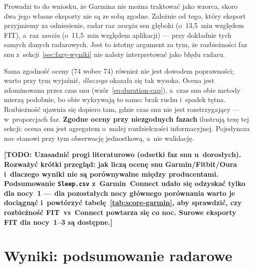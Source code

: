 \documentclass[12pt,a4paper,oneside]{report}
\newcommand{\todo}[1]{\textcolor{red!75!black}{\textbf{[TODO: #1]}}}
\begin{document}
Prowadzi to do wniosku, że Garmina nie można traktować jako wzorca, skoro
dwa jego własne eksporty nie są ze sobą zgodne. Zależnie od tego, który eksport
przyjmiemy za odniesienie, radar raz \emph{zawyża} sen głęboki (o~13,5~min względem FIT),
a~raz \emph{zaniża} (o~11,5~min względem aplikacji) --- przy dokładnie tych
samych danych radarowych. Jest to istotny argument za
tym, że rozbieżności faz snu z~sekcji~\ref{sec:fazy-wyniki} nie należy
interpretować jako błędu radaru.

Sama zgodność oceny (74 wobec 74) również nie jest dowodem poprawności; warto
przy tym wyjaśnić, \emph{dlaczego} okazała się tak wysoka. Ocena jest zdominowana przez czas
snu (wzór~\eqref{eq:duration-cap}), a~czas snu obie metody mierzą podobnie, bo
obie wykrywają to samo: brak ruchu i~spadek tętna. Rozbieżność ujawnia się dopiero
tam, gdzie czas snu nie jest rozstrzygający --- w~proporcjach faz. \textbf{Zgodne oceny
przy niezgodnych fazach} ilustrują tezę tej sekcji: ocena snu
jest agregatem o~małej rozdzielczości informacyjnej. Pojedyncza noc stanowi
przy tym obserwację jednostkową, a~nie walidację.

\todo{Uzasadnić progi literaturowo (odsetki faz snu u~dorosłych). Rozważyć
krótki przegląd: jak liczą ocenę snu Garmin/Fitbit/Oura i~dlaczego wyniki nie
są porównywalne między producentami. Podsumowanie \texttt{Sleep.csv}
z~Garmin~Connect udało się odzyskać tylko dla nocy~1 --- dla
pozostałych nocy głównego porównania warto je dociągnąć i~powtórzyć
tabelę~\ref{tab:score-garmin}, aby sprawdzić, czy rozbieżność FIT~vs~Connect
powtarza się co noc. Surowe eksporty FIT dla nocy~1--3 są dostępne.}

\section{Wyniki: podsumowanie radarowe}

\begin{table}[H]
\centering
\caption{Podsumowanie snu wyznaczone wyłącznie z~radaru. Pierwsze trzy
wiersze tworzą główny zestaw porównawczy z~eksportem Garmina; dwa ostatnie
pokazują powtarzalność stanowiska z~płaską pokrywą nad łóżkiem.}
\label{tab:sensummary}
\small
{}
\end{table}
\end{document}
